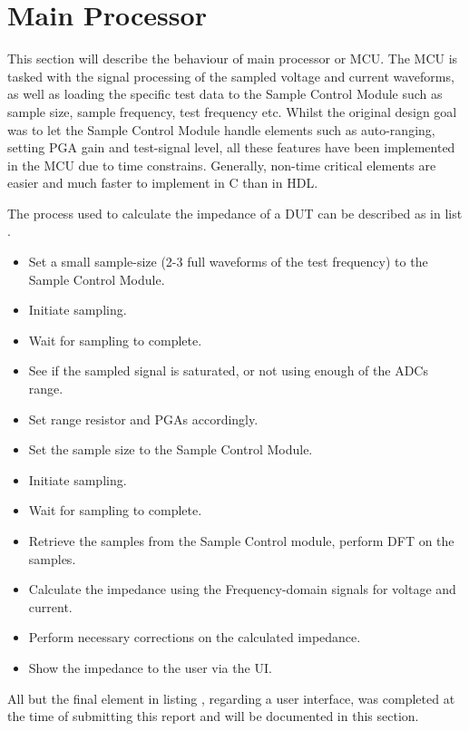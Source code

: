 \section{Main Processor} \label{sec:MCU}
This section will describe the behaviour of main processor or MCU. The MCU is tasked with the signal processing of the sampled voltage and current waveforms, as well as loading the specific test data to the Sample Control Module such as sample size, sample frequency, test frequency etc. Whilst the original design goal was to let the Sample Control Module handle elements such as auto-ranging, setting PGA gain and test-signal level, all these features have been implemented in the MCU due to time constrains. Generally, non-time critical elements are easier and much faster to implement in C than in HDL.

The process used to calculate the impedance of a DUT can be described as in list .
\begin{itemize}
\label{lst_7_3}
    \item Set a small sample-size (2-3 full waveforms of the test frequency) to the Sample Control Module.
    \item Initiate sampling.
    \item Wait for sampling to complete. 
    \item See if the sampled signal is saturated, or not using enough of the ADCs range.
    \item Set range resistor and PGAs accordingly.
    \item Set the sample size to the Sample Control Module.
    \item Initiate sampling.
    \item Wait for sampling to complete. 
    \item Retrieve the samples from the Sample Control module, perform DFT on the samples.
    \item Calculate the impedance using the Frequency-domain signals for voltage and current. 
    \item Perform necessary corrections on the calculated impedance. 
    \item Show the impedance to the user via the UI.
\end{itemize}

All but the final element in listing , regarding a user interface, was completed at the time of submitting this report and will be documented in this section.

